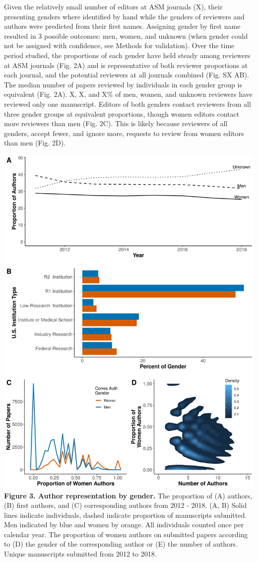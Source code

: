 \documentclass[11pt,]{article}
\begin{document}
Given the relatively small number of editors at ASM journals (X), their
presenting genders where identified by hand while the genders of
reviewers and authors were predicted from their first names. Assigning
gender by first name resulted in 3 possible outcomes: men, women, and
unknown (when gender could not be assigned with confidence, see Methods
for validation). Over the time period studied, the proportions of each
gender have held steady among reviewers at ASM journals (Fig. 2A) and is
representative of both reviewer proportions at each journal, and the
potential reviewers at all journals combined (Fig. SX AB). The median
number of papers reviewed by individuals in each gender group is
equivalent (Fig. 2A). X, X, and X\% of men, women, and unknown reviewers
have reviewed only one manuscript. Editors of both genders contact
reviewers from all three gender groups at equivalent proportions, though
women editors contact more reviewers than men (Fig. 2C). This is likely
because reviewers of all genders, accept fewer, and ignore more,
requests to review from women editors than men (Fig. 2D).

\includegraphics{Figure_3.png} \textbf{Figure 3. Author representation
by gender.} The proportion of (A) authors, (B) first authors, and (C)
corresponding authors from 2012 - 2018. (A, B) Solid lines indicate
individuals, dashed indicate proportion of manuscripts submitted. Men
indicated by blue and women by orange. All individuals counted once per
calendar year. The proportion of women authors on submitted papers
according to (D) the gender of the corresponding author or (E) the
number of authors. Unique manuscripts submitted from 2012 to 2018.
\end{document}
